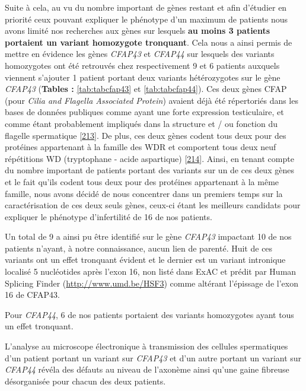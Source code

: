 \documentclass[12pt,a4paper,twoside]{ugathesis}
\theoremstyle{definition}
\theoremstyle{definition}
\theoremstyle{definition}
\theoremstyle{remark}
\begin{document}
Suite à cela, au vu du nombre important de gènes restant et afin
d'étudier en priorité ceux pouvant expliquer le phénotype d'un maximum
de patients nous avons limité nos recherches aux gènes sur lesquels
\textbf{au moins 3 patients portaient un variant homozygote tronquant}.
Cela nous a ainsi permis de mettre en évidence les gènes \emph{CFAP43}
et \emph{CFAP44} sur lesquels des variants homozygotes ont été retrouvés
chez respectivement 9 et 6 patients auxquels viennent s'ajouter 1
patient portant deux variants hétérozygotes sur le gène \emph{CFAP43}
(\textbf{Tables : }\ref{tab:tabcfap43} et \ref{tab:tabcfap44}). Ces deux
gènes CFAP (pour \emph{Cilia and Flagella Associated Protein}) avaient
déjà été répertoriés dans les bases de données publiques comme ayant une
forte expression testiculaire, et comme étant probablement impliqués
dans la structure et / ou fonction du flagelle spermatique
{[}\protect\hyperlink{ref-Ivliev2012}{213}{]}. De plus, ces deux gènes
codent tous deux pour des protéines appartenant à la famille des WDR et
comportent tous deux neuf répétitions WD (tryptophane - acide
aspartique) {[}\protect\hyperlink{ref-Smith2008}{214}{]}. Ainsi, en
tenant compte du nombre important de patients portant des variants sur
un de ces deux gènes et le fait qu'ils codent tous deux pour des
protéines appartenant à la même famille, nous avons décidé de nous
concentrer dans un premiers temps sur la caractérisation de ces deux
seuls gènes, ceux-ci étant les meilleurs candidats pour expliquer le
phénotype d'infertilité de 16 de nos patients.

Un total de 9 a ainsi pu être identifié sur le gène \emph{CFAP43}
impactant 10 de nos patients n'ayant, à notre connaissance, aucun lien
de parenté. Huit de ces variants ont un effet tronquant évident et le
dernier est un variant intronique localisé 5 nucléotides après l'exon
16, non listé dans ExAC et prédit par Human Splicing Finder
(\url{http://www.umd.be/HSF3}) comme altérant l'épissage de l'exon 16 de
CFAP43.

Pour \emph{CFAP44}, 6 de nos patients portaient des variants homozygotes
ayant tous un effet tronquant.

L'analyse au microscope électronique à transmission des cellules
spermatiques d'un patient portant un variant sur \emph{CFAP43} et d'un
autre portant un variant sur \emph{CFAP44} révéla des défauts au niveau
de l'axonème ainsi qu'une gaine fibreuse désorganisée pour chacun des
deux patients.
\end{document}
